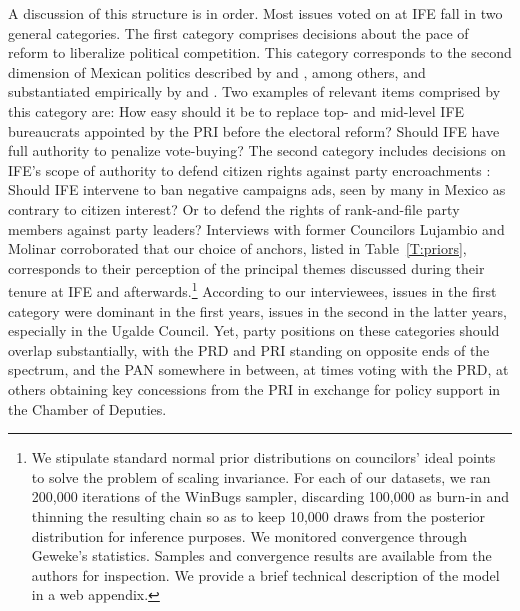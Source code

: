 \documentclass[12 pt, letter]{article}
\begin{document}
A discussion of this structure is in order. Most issues voted on at
IFE fall in two general categories. The first category comprises
decisions about the pace of reform to liberalize political
competition. This category corresponds to the second dimension of
Mexican politics described by \citet{Molinar1991} and
\citet{Lujambio2001}, among others, and substantiated empirically by
\citet{Moreno2003a} and \citet{Magaloni2006}.  Two examples of
relevant items comprised by this category are: How easy should it be
to replace top- and mid-level IFE bureaucrats appointed by the PRI
before the electoral reform? Should IFE have full authority to
penalize vote-buying?  The second category includes decisions on
IFE's scope of authority to defend citizen rights against party
encroachments \citep[cf][]{Cardenas2004}: Should IFE intervene to
ban negative campaigns ads, seen by many in Mexico as contrary to
citizen interest? Or to defend the rights of rank-and-file party
members against party leaders? Interviews with former Councilors
Lujambio and Molinar corroborated that our choice of anchors, listed
in Table~\ref{T:priors}, corresponds  to their perception of the
principal themes discussed during their tenure at IFE and
afterwards.\footnote{We stipulate standard normal prior
distributions on councilors' ideal points to solve the problem of
scaling invariance. For each of our datasets, we ran 200,000
iterations of the WinBugs sampler, discarding 100,000 as burn-in and
thinning the resulting chain so as to keep 10,000 draws from the
posterior distribution for inference purposes. We monitored
convergence through Geweke's statistics. Samples and convergence
results are available from the authors for inspection. We provide a
brief technical description of the model in a web appendix.}
According to our interviewees, issues in the first category were
dominant in the first years, issues in the second in the latter
years, especially in the Ugalde Council. Yet, party positions on
these  categories should overlap substantially, with the PRD and PRI
standing on opposite ends of the spectrum, and the PAN somewhere in
between, at times voting with the PRD, at others obtaining key
concessions from the PRI in exchange for policy support in the
Chamber of Deputies.
\end{document}
